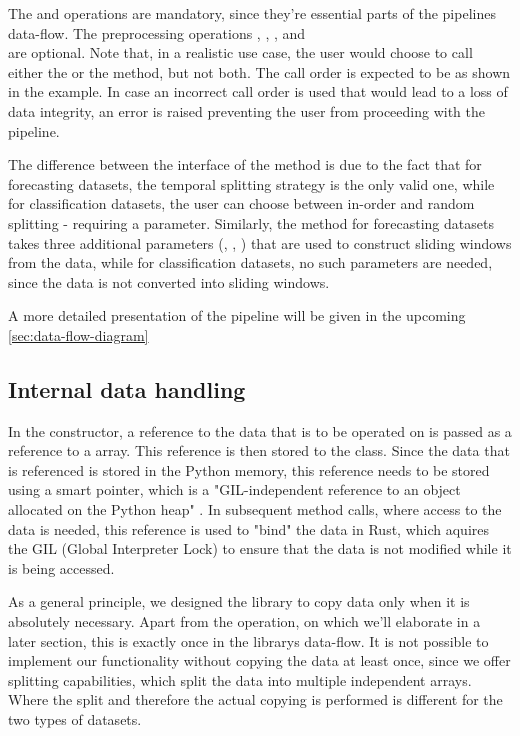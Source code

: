 \documentclass[review]{AIM_report}
\begin{document}
The \splitShort and \collect operations are mandatory, since they're essential parts of the pipelines data-flow. The preprocessing operations \impute, \downsample, \normalize, and \\\standardize are optional. Note that, in a realistic use case, the user would choose to call either the \normalize or the \standardize method, but not both. The call order is expected to be as shown in the example. In case an incorrect call order is used that would lead to a loss of data integrity, an error is raised preventing the user from proceeding with the pipeline.

The difference between the interface of the \splitShort method is due to the fact that for forecasting datasets, the temporal splitting strategy is the only valid one, while for classification datasets, the user can choose between in-order and random splitting - requiring a parameter. Similarly, the \collect method for forecasting datasets takes three additional parameters (\pastWindow, \futureHorizon, \stride) that are used to construct sliding windows from the data, while for classification datasets, no such parameters are needed, since the data is not converted into sliding windows.

A more detailed presentation of the pipeline will be given in the upcoming \autoref{sec:data-flow-diagram}

\subsection{Internal data handling}

In the constructor, a reference to the data that is to be operated on is passed as a reference to a \numpy array. This reference is then stored to the class. Since the data that is referenced is stored in the Python memory, this reference needs to be stored using a \py smart pointer, which is a "GIL-independent reference to an object allocated on the Python heap" \cite{PyO3PyStruct}. In subsequent method calls, where access to the data is needed, this reference is used to "bind" the data in Rust, which aquires the GIL (Global Interpreter Lock) to ensure that the data is not modified while it is being accessed.

As a general principle, we designed the library to copy data only when it is absolutely necessary. Apart from the \downsample operation, on which we'll elaborate in a later section, this is exactly once in the librarys data-flow. It is not possible to implement our functionality without copying the data at least once, since we offer splitting capabilities, which split the data into multiple independent arrays. Where the split and therefore the actual copying is performed is different for the two types of datasets.
\end{document}
